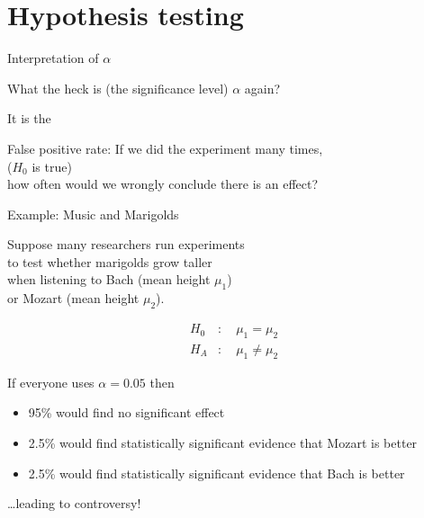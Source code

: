\section{Hypothesis testing}

\begin{frame}{Interpretation of $\alpha$}

  What the heck is (the significance level) $\alpha$ again?

  \vspace{2em}
  \pause

  It is the 
  \begin{block}{False positive rate:}
    If we did the experiment many times,\\
     ($H_0$ is true)\\
    how often would we \alert{wrongly} conclude there is an effect?
  \end{block}

\end{frame}



\begin{frame}{Example: Music and Marigolds}

    Suppose many researchers run experiments\\
    to test whether marigolds grow taller \\
    when listening to Bach (mean height $\mu_1$) \\
    or Mozart (mean height $\mu_2$). 


    \vspace{2em}

    \begin{align*}
        H_0 &: \quad \mu_1 = \mu_2  \\
        H_A &: \quad \mu_1 \neq \mu_2 
    \end{align*}

    \vspace{2em}

    If everyone uses $\alpha=0.05$ then
    \begin{itemize}
        \item 95\% would find no significant effect
        \item 2.5\% would find statistically significant evidence that Mozart is better
        \item 2.5\% would find statistically significant evidence that Bach is better
    \end{itemize}
    \ldots leading to \alert{controversy!}

\end{frame}


